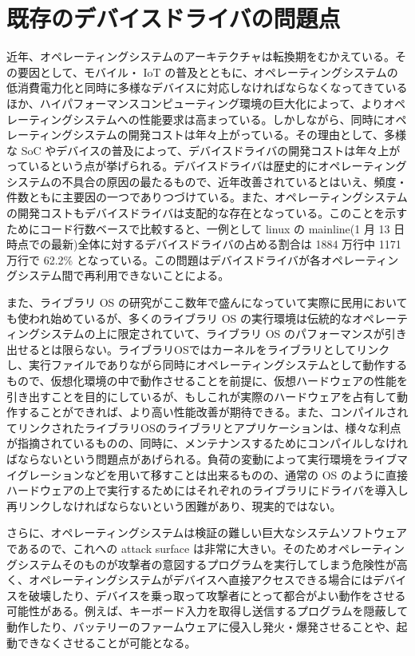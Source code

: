 \documentclass[a4paper,11pt,report]{ltjsbook}
\begin{document}
\section{既存のデバイスドライバの問題点}
近年、オペレーティングシステムのアーキテクチャは転換期をむかえている。その要因として、モバイル・ IoT の普及とともに、オペレーティングシステムの低消費電力化と同時に多様なデバイスに対応しなければならなくなってきているほか、ハイパフォーマンスコンピューティング環境の巨大化によって、よりオペレーティングシステムへの性能要求は高まっている。しかしながら、同時にオペレーティングシステムの開発コストは年々上がっている。その理由として、多様な SoC やデバイスの普及によって、デバイスドライバの開発コストは年々上がっているという点が挙げられる。デバイスドライバは歴史的にオペレーティングシステムの不具合の原因の最たるもので\cite{oserrors}、近年改善されているとはいえ、頻度・件数ともに主要因の一つでありつづけている\cite{faults}。また、オペレーティングシステムの開発コストもデバイスドライバは支配的な存在となっている。このことを示すためにコード行数ベースで比較すると、一例として linux の mainline(1 月 13 日時点での最新)全体に対するデバイスドライバの占める割合は 1884 万行中 1171 万行で 62.2\% となっている。この問題はデバイスドライバが各オペレーティングシステム間で再利用できないことによる。

また、ライブラリ OS の研究がここ数年で盛んになっていて実際に民用においても使われ始めているが、多くのライブラリ OS の実行環境は伝統的なオペレーティングシステムの上に限定されていて、ライブラリ OS のパフォーマンスが引き出せるとは限らない。ライブラリOSではカーネルをライブラリとしてリンクし、実行ファイルでありながら同時にオペレーティングシステムとして動作するもので、仮想化環境の中で動作させることを前提に、仮想ハードウェアの性能を引き出すことを目的にしているが、もしこれが実際のハードウェアを占有して動作することができれば、より高い性能改善が期待できる。また、コンパイルされてリンクされたライブラリOSのライブラリとアプリケーションは、様々な利点が指摘されているものの、同時に、メンテナンスするためにコンパイルしなければならないという問題点があげられる。負荷の変動によって実行環境をライブマイグレーション\cite{livemgrt}などを用いて移すことは出来るものの、通常の OS のように直接ハードウェアの上で実行するためにはそれぞれのライブラリにドライバを導入し再リンクしなければならないという困難があり、現実的ではない。%

さらに、オペレーティングシステムは検証の難しい巨大なシステムソフトウェアであるので、これへの attack surface は非常に大きい。そのためオペレーティングシステムそのものが攻撃者の意図するプログラムを実行してしまう危険性が高く、オペレーティングシステムがデバイスへ直接アクセスできる場合にはデバイスを破壊したり、デバイスを乗っ取って攻撃者にとって都合がよい動作をさせる可能性がある。例えば、キーボード入力を取得し送信するプログラムを隠蔽して動作したり\cite{thinkpadkeyvlnt}、バッテリーのファームウェアに侵入し発火・爆発させることや\cite{macbookbatvlnt}、起動できなくさせること\cite{takekoshinvmvlnt}が可能となる。
\end{document}
